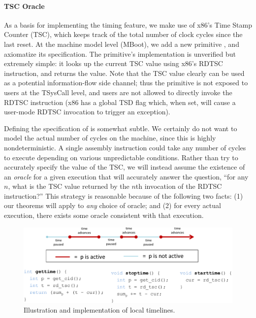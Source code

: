 \paragraph{TSC Oracle}
As a basis for implementing the timing feature, we make use of 
x86's Time Stamp Counter (TSC), which keeps track of the total
number of clock cycles since the last reset. At the machine model
level (MBoot), we add a new primitive , and axiomatize
its specification. The primitive's implementation is unverified
but extremely simple: it looks up the current TSC value using
x86's RDTSC instruction, and returns the value. Note that the
TSC value clearly can be used as a potential information-flow
side channel; thus the  primitive is not exposed to
users at the TSysCall level, and users are not allowed to directly
invoke the RDTSC instruction (x86 has a global TSD flag which, 
when set, will cause a user-mode RDTSC invocation to trigger
an exception).

Defining the specification of  is somewhat subtle.
We certainly do not want to model the actual number of cycles on
the machine, since this is highly nondeterministic. A single
assembly instruction could take any number of cycles to
execute depending on various unpredictable conditions. Rather
than try to accurately specify the value of the TSC, we will instead assume 
the existence of an \emph{oracle} for a given execution that will 
accurately answer the question, ``for any $n$, what is the TSC 
value returned by the $n$th invocation of the RDTSC instruction?''
This strategy is reasonable because of the following two facts:
(1) our theorems will apply to \emph{any} choice of oracle; and 
(2) for every actual execution, there exists some oracle consistent 
with that execution.

\begin{figure}[t]
\begin{center}
\includegraphics[scale=0.685]{pldi/figure/timeline}
\caption{\small Illustration and implementation of local timelines.}
\label{fig:timeline}
\end{center}
\end{figure}

